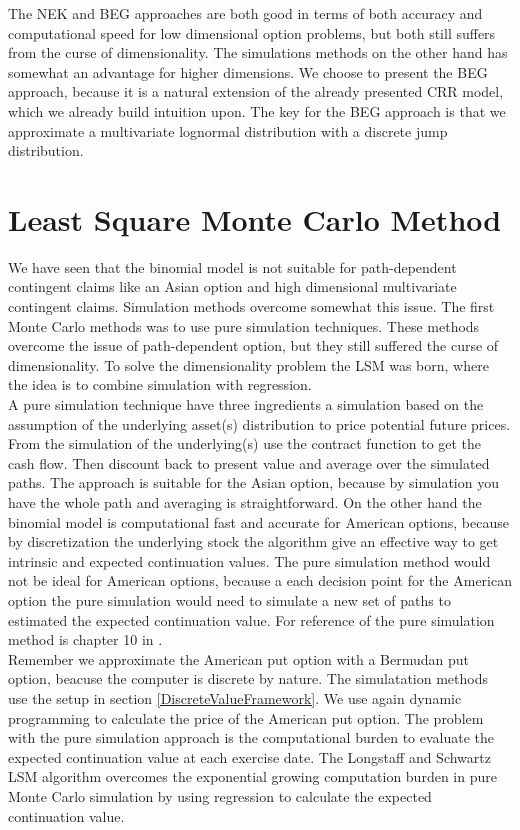 The NEK and BEG approaches are both good in terms of both accuracy and computational speed for low dimensional option problems, but both still suffers from the curse of dimensionality. The simulations methods on the other hand has somewhat an advantage for higher dimensions. We choose to present the BEG approach, because it is a natural extension of the already presented CRR model, which we already build intuition upon. The key for the BEG approach is that we approximate a multivariate lognormal distribution with a discrete jump distribution. 

\newpage

\section{Least Square Monte Carlo Method}\label{LSM}
We have seen that the binomial model is not suitable for path-dependent contingent claims like an Asian option and high dimensional multivariate contingent claims. Simulation methods overcome somewhat this issue. The first Monte Carlo methods was to use pure simulation techniques. These methods overcome the issue of path-dependent option, but they still suffered the curse of dimensionality. To solve the dimensionality problem the LSM was born, where the idea is to combine simulation with regression. \\

A pure simulation technique have three ingredients a simulation based on the assumption of the underlying asset(s) distribution to price potential future prices. From the simulation of the underlying(s) use the contract function to get the cash flow. Then discount back to present value and average over the simulated paths. The approach is suitable for the Asian option, because by simulation you have the whole path and averaging is straightforward. On the other hand the binomial model is computational fast and accurate for American options, because by discretization the underlying stock the algorithm give an effective way to get intrinsic and expected continuation values. The pure simulation method would not be ideal for American options, because a each decision point for the American option the pure simulation would need to simulate a new set of paths to estimated the expected continuation value. For reference of the pure simulation method is chapter 10 in \parencite{OVERHAUSMARCUS2007EHD}.\\ 

Remember we approximate the American put option with a Bermudan put option, beacuse the computer is discrete by nature. The simulatation methods use the setup in section \ref{DiscreteValueFramework}. We use again dynamic programming to calculate the price of the American put option. The problem with the pure simulation approach is the computational burden to evaluate the expected continuation value at each exercise date. The Longstaff and Schwartz LSM algorithm overcomes the exponential growing computation burden in pure Monte Carlo simulation by using regression to calculate the expected continuation value.

